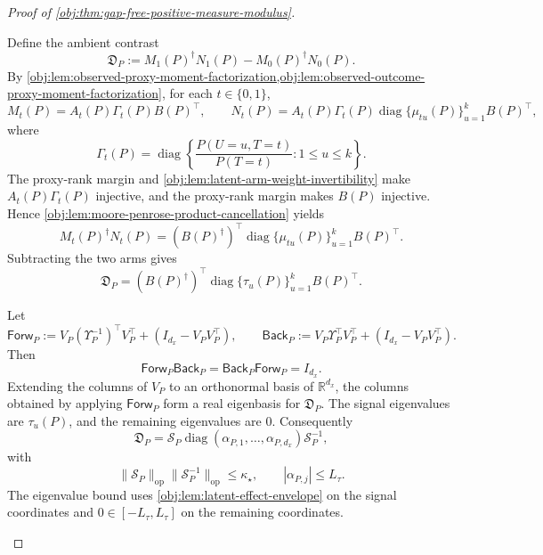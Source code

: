 \documentclass[11pt]{article}
\begin{document}
\begin{proof}[Proof of \cref{obj:thm:gap-free-positive-measure-modulus}]
\begin{enumerate}
Define the ambient contrast
\[
\mathfrak D_P
:=
M_1(P)^\dagger N_1(P)-M_0(P)^\dagger N_0(P).
\]
By \cref{obj:lem:observed-proxy-moment-factorization,obj:lem:observed-outcome-proxy-moment-factorization}, for each \(t\in\{0,1\}\),
\[
M_t(P)=A_t(P)\Gamma_t(P)B(P)^\top,
\qquad
N_t(P)=A_t(P)\Gamma_t(P)
\operatorname{diag}\{\mu_{tu}(P)\}_{u=1}^kB(P)^\top ,
\]
where
\[
\Gamma_t(P)=
\operatorname{diag}\left\{
\frac{P(U=u,T=t)}{P(T=t)}:1\le u\le k
\right\}.
\]
The proxy-rank margin and \cref{obj:lem:latent-arm-weight-invertibility} make
\(A_t(P)\Gamma_t(P)\) injective, and the proxy-rank margin makes \(B(P)\) injective.  Hence
\cref{obj:lem:moore-penrose-product-cancellation} yields
\[
M_t(P)^\dagger N_t(P)
=
(B(P)^\dagger)^\top
\operatorname{diag}\{\mu_{tu}(P)\}_{u=1}^kB(P)^\top .
\]
Subtracting the two arms gives
\[
\mathfrak D_P
=
(B(P)^\dagger)^\top
\operatorname{diag}\{\tau_u(P)\}_{u=1}^kB(P)^\top .
\]

Let
\[
\mathsf{Forw}_P
:=
V_P(\Upsilon_P^{-1})^\top V_P^\top+(I_{d_x}-V_PV_P^\top),
\qquad
\mathsf{Back}_P
:=
V_P\Upsilon_P^\top V_P^\top+(I_{d_x}-V_PV_P^\top).
\]
Then
\[
\mathsf{Forw}_P\mathsf{Back}_P
=
\mathsf{Back}_P\mathsf{Forw}_P
=
I_{d_x}.
\]
Extending the columns of \(V_P\) to an orthonormal basis of \(\mathbb R^{d_x}\), the columns obtained by applying \(\mathsf{Forw}_P\) form a real eigenbasis for \(\mathfrak D_P\).  The signal eigenvalues are \(\tau_u(P)\), and the remaining eigenvalues are \(0\).  Consequently
\begin{equation}
\mathfrak D_P
=
\mathcal S_P\operatorname{diag}(\alpha_{P,1},\ldots,\alpha_{P,d_x})
\mathcal S_P^{-1},
\label{eq:gap-free-model-diagonalization}
\end{equation}
with
\[
\|\mathcal S_P\|_{\mathrm{op}}\|\mathcal S_P^{-1}\|_{\mathrm{op}}
\le \kappa_\star,
\qquad
|\alpha_{P,j}|\le L_\tau .
\]
The eigenvalue bound uses \cref{obj:lem:latent-effect-envelope} on the signal coordinates and \(0\in[-L_\tau,L_\tau]\) on the remaining coordinates.


\end{enumerate}
\end{proof}
\end{document}
